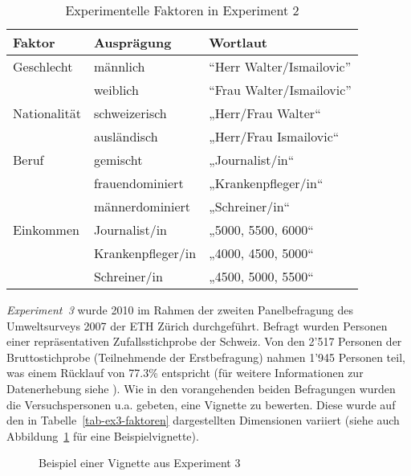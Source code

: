 \documentclass[a4paper,12pt]{article}
\begin{document}
\begin{table}
    \small
    \caption{Experimentelle Faktoren in Experiment 2}\label{tab-ex2-faktoren}
    \begin{tabularx}{\textwidth}{@{}llX@{}}
        \toprule
        Faktor          & Ausprägung & Wortlaut       \\\midrule
        Geschlecht      & männlich     & “Herr Walter/Ismailovic”   \\
                        & weiblich     & “Frau Walter/Ismailovic”   \\
        \addlinespace
        Nationalität   & schweizerisch         & „Herr/Frau Walter“ \\
                        & ausländisch         & „Herr/Frau Ismailovic“ \\
        \addlinespace
        Beruf        & gemischt         & „Journalist/in“   \\
                        & frauendominiert         & „Krankenpfleger/in“  \\
				& männerdominiert         & „Schreiner/in“  \\
	  \addlinespace
        Einkommen        & Journalist/in         & „5000, 5500, 6000“   \\
					& Krankenpfleger/in & „4000, 4500, 5000“   \\
					& Schreiner/in & „4500, 5000, 5500“   \\
        \bottomrule
    \end{tabularx}
\end{table}

\emph{Experiment~3} wurde 2010 im Rahmen der zweiten Panelbefragung des Umweltsurveys
2007 der ETH Zürich durchgeführt. Befragt wurden Personen einer repräsentativen
Zufallsstichprobe der Schweiz. Von den 2'517 Personen der Bruttostichprobe
(Teilnehmende der Erstbefragung) nahmen 1'945 Personen teil, was einem Rücklauf
von 77.3\% entspricht (für weitere Informationen zur Datenerhebung siehe
\citealp{Diekmann-etal-2009}). Wie in den vorangehenden beiden Befragungen
wurden die Versuchspersonen u.a. gebeten, eine Vignette zu bewerten. Diese wurde
auf den in Tabelle~\ref{tab-ex3-faktoren} dargestellten Dimensionen variiert (siehe auch Abbildung~\ref{fig-3} für eine Beispielvignette).


\begin{figure}\centering
    \caption{Beispiel einer Vignette aus Experiment 3}\label{fig-3}
\end{figure}
\end{document}
